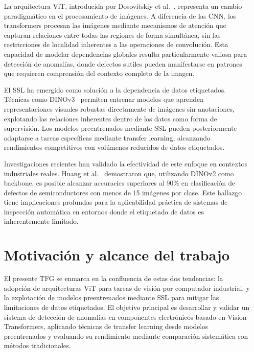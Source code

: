 La arquitectura \acrfull{ViT}, introducida por Dosovitskiy et al.~\cite{dosovitskiy2021vit}, representa un cambio paradigmático en el procesamiento de imágenes. A diferencia de las \acrshort{CNN}, los transformers procesan las imágenes mediante mecanismos de atención que capturan relaciones entre todas las regiones de forma simultánea, sin las restricciones de localidad inherentes a las operaciones de convolución. Esta capacidad de modelar dependencias globales resulta particularmente valiosa para detección de anomalías, donde defectos sutiles pueden manifestarse en patrones que requieren comprensión del contexto completo de la imagen.

El \acrfull{SSL} ha emergido como solución a la dependencia de datos etiquetados. Técnicas como DINOv3~\cite{simeoni2025dinov3} permiten entrenar modelos que aprenden representaciones visuales robustas directamente de imágenes sin anotaciones, explotando las relaciones inherentes dentro de los datos como forma de supervisión. Los modelos preentrenados mediante \acrshort{SSL} pueden posteriormente adaptarse a tareas específicas mediante transfer learning, alcanzando rendimientos competitivos con volúmenes reducidos de datos etiquetados.

Investigaciones recientes han validado la efectividad de este enfoque en contextos industriales reales. Huang et al.~\cite{huang2025semiconductor} demostraron que, utilizando DINOv2 como backbone, es posible alcanzar accuracies superiores al 90\% en clasificación de defectos de semiconductores con menos de 15 imágenes por clase. Este hallazgo tiene implicaciones profundas para la aplicabilidad práctica de sistemas de inspección automática en entornos donde el etiquetado de datos es inherentemente limitado.


\section{Motivación y alcance del trabajo}
\label{sec:motivacion}

El presente \gls{TFG} se enmarca en la confluencia de estas dos tendencias: la adopción de arquitecturas \acrshort{ViT} para tareas de visión por computador industrial, y la explotación de modelos preentrenados mediante \acrshort{SSL} para mitigar las limitaciones de datos etiquetados. El objetivo principal es desarrollar y validar un sistema de detección de anomalías en componentes electrónicos basado en Vision Transformers, aplicando técnicas de transfer learning desde modelos preentrenados y evaluando su rendimiento mediante comparación sistemática con métodos tradicionales.

